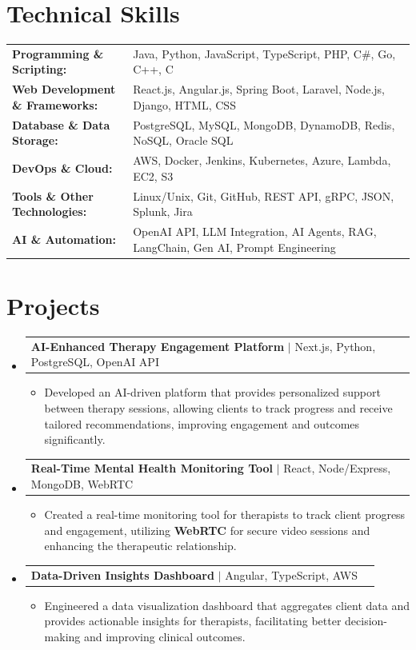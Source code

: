 \documentclass[letterpaper,10pt]{article}
\makeatletter
\newcommand{\resumeItem}[1]{
  \item{\fontsize{8pt}{9pt}\selectfont
    #1 \vspace{-3pt}
  }
}
\newcommand{\resumeProjectHeading}[2]{
    \item
    \begin{tabular*}{1.001\textwidth}{l@{\extracolsep{\fill}}r}
      \fontsize{8.5pt}{10pt}#1 & \textbf{\fontsize{8.5pt}{10pt} #2}\\
    \end{tabular*}\vspace{-7pt}
}
\newcommand{\resumeSubHeadingListStart}{\begin{itemize}[leftmargin=0pt, label={}]}
\newcommand{\resumeSubHeadingListEnd}{\end{itemize}}
\newcommand{\resumeItemListStart}{\begin{itemize}[leftmargin=*]}
\newcommand{\resumeItemListEnd}{\end{itemize}\vspace{-5pt}}
\makeatother
\begin{document}
\section{Technical Skills}
        \vspace{-14pt}
        \begin{table}[h]
            \fontsize{8pt}{9pt}\selectfont
            \begin{tabular}{p{0.3\linewidth} p{0.7\linewidth}}
                \textbf{Programming \& Scripting:} & Java, Python, JavaScript, TypeScript, PHP, C\#, Go, C++, C \\
                \textbf{Web Development \& Frameworks:} & React.js, Angular.js, Spring Boot, Laravel, Node.js, Django, HTML, CSS \\
                \textbf{Database \& Data Storage:} & PostgreSQL, MySQL, MongoDB, DynamoDB, Redis, NoSQL, Oracle SQL \\
                \textbf{DevOps \& Cloud:} & AWS, Docker, Jenkins, Kubernetes, Azure, Lambda, EC2, S3 \\
                \textbf{Tools \& Other Technologies:} & Linux/Unix, Git, GitHub, REST API, gRPC, JSON, Splunk, Jira \\
                \textbf{AI \& Automation:} & OpenAI API, LLM Integration, AI Agents, RAG, LangChain, Gen AI, Prompt Engineering \\
            \end{tabular}
        \end{table}
 \vspace{-18pt}

\section{Projects}
    \vspace{-5pt}
    \resumeSubHeadingListStart
          \resumeProjectHeading
            {\textbf{AI-Enhanced Therapy Engagement Platform} $|$ Next.js, Python, PostgreSQL, OpenAI API}{}
            \resumeItemListStart
                \resumeItem{Developed an AI-driven platform that provides personalized support between therapy sessions, allowing clients to track progress and receive tailored recommendations, improving engagement and outcomes significantly.}
            \resumeItemListEnd
        \vspace{-12pt}
    
        \resumeProjectHeading
            {\textbf{Real-Time Mental Health Monitoring Tool} $|$ React, Node/Express, MongoDB, WebRTC}{}
        \resumeItemListStart
                \resumeItem{Created a real-time monitoring tool for therapists to track client progress and engagement, utilizing \textbf{WebRTC} for secure video sessions and enhancing the therapeutic relationship.}
        \resumeItemListEnd
      \vspace{-12pt}
      \resumeProjectHeading
        {\textbf{Data-Driven Insights Dashboard} $|$ Angular, TypeScript, AWS}{}
    \resumeItemListStart
            \resumeItem{Engineered a data visualization dashboard that aggregates client data and provides actionable insights for therapists, facilitating better decision-making and improving clinical outcomes.}
    \resumeItemListEnd
    \resumeSubHeadingListEnd
\end{document}
